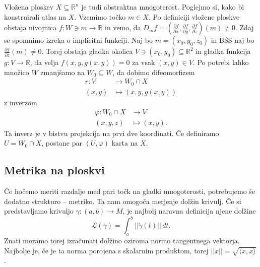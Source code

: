 \documentclass[10pt, a4paper]{article}
\begin{document}
Vložena ploskev $X \subseteq  \mathbb{R}^n$ je tudi abstraktna
mnogoterost. Poglejmo si, kako bi konstruirali atlas na $X$.
Vzemimo točko $m \in  X$. Po definiciji vložene ploskve
obstaja nivojnica $f: W \ni m \to \mathbb{R}$ in vemo, da
$D_mf = \left( \frac{ \partial f }{ \partial x } , \frac{
\partial f }{ \partial y }  , \frac{ \partial f }{ \partial z
} \right)\left( m \right) \neq 0$. Zdaj se spomnimo izreka o
implicitni funkciji. Naj bo $m = \left( x_0, y_0 , z_0 \right)$ in
BŠS naj bo $\frac{ \partial f }{ \partial z }\left( m \right) \neq
0$. Torej obstaja gladka okolica $V \ni \left( x_0, y_0 \right)
\subseteq \mathbb{R}^2$  in gladka funkcija $g: V \to \mathbb{R}$,
da velja $f\left( x, y, g\left( x,y \right) \right) = 0$  za vsak
$\left( x,y \right) \in  V$. Po potrebi lahko množico $W$
zmanjšamo na $W_0 \subseteq  W$, da dobimo difeomorfizem
\begin{align*} r: V &\longrightarrow W_0 \cap  X \\ \left( x,y
\right) &\longmapsto \left( x,y,g\left( x,y \right) \right)
\end{align*} z inverzom \begin{align*} \varphi: W_0 \cap X
&\longrightarrow V \\ \left( x,y,z \right)
&\longmapsto \left( x,y \right). \end{align*}Ta inverz
je v bistvu projekcija na prvi dve koordinati. Če
definiramo $U = W_0 \cap  X$, postane par $\left( U,
\varphi \right)$ karta na $X$.  

\subsection{Metrika na ploskvi}%

Če hočemo meriti razdalje med pari točk na gladki
mnogoterosti, potrebujemo še dodatno strukturo --
metriko. Ta nam omogoča merjenje dolžin krivulj. Če si
predstavljamo krivuljo $\gamma : \left( a,b \right)
\to M$, je najbolj naravna definicija njene dolžine \[
\mathcal{L}\left( \gamma \right) = \int_{a}^{b}
\lvert\lvert \dot{\gamma } \left( t \right) \rvert\rvert
\, dt. \]Znati moramo torej izračunati dolžino oziroma normo
tangentnega vektorja. Najbolje je, če je ta norma porojena s
skalarnim produktom, torej $\lvert\lvert x \rvert\rvert =
\sqrt{\langle x,x \rangle } $.
\end{document}
